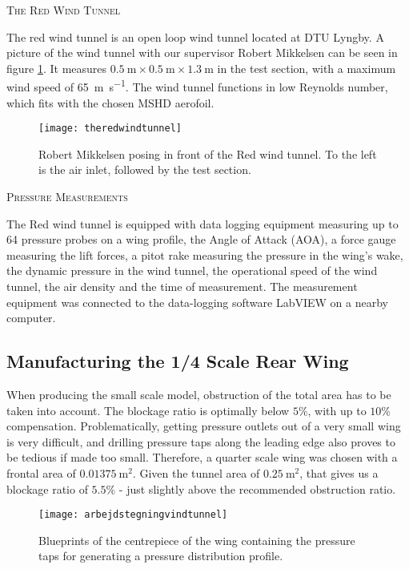     \textsc{The Red Wind Tunnel}

      The red wind tunnel is an open loop wind tunnel located at DTU Lyngby. A picture of the wind tunnel with our supervisor Robert Mikkelsen can be seen in figure \ref{fig:theredwindtunnel}. It measures $\SI{0.5}{\metre} \times \SI{0.5}{\metre} \times \SI{1.3}{\metre}$ in the test section, with a maximum wind speed of \SI{65}{\metre\per\second}. The wind tunnel functions in low Reynolds number, which fits with the chosen MSHD aerofoil.

      \begin{figure}
        \texttt{[image: theredwindtunnel]}
        \caption{Robert Mikkelsen posing in front of the Red wind tunnel. To the left is the air inlet, followed by the test section.}
        \label{fig:theredwindtunnel}
      \end{figure}

    \textsc{Pressure Measurements}

      The Red wind tunnel is equipped with data logging equipment measuring up to 64 pressure probes on a wing profile, the Angle of Attack (AOA), a force gauge measuring the lift forces, a pitot rake measuring the pressure in the wing's wake, the dynamic pressure in the wind tunnel, the operational speed of the wind tunnel, the air density and the time of measurement. The measurement equipment was connected to the data-logging software LabVIEW on a nearby computer.

  \subsection{Manufacturing the 1/4 Scale Rear Wing}

    When producing the small scale model, obstruction of the total area has to be taken into account. The blockage ratio is optimally below $5\%$, with up to $10\%$ compensation. Problematically, getting pressure outlets out of a very small wing is very difficult, and drilling pressure taps along the leading edge also proves to be tedious if made too small. Therefore, a quarter scale wing was chosen with a frontal area of $\SI{0.01375}{\metre\squared}$. Given the tunnel area of $\SI{0.25}{\metre\squared}$, that gives us a blockage ratio of $5.5\%$ - just slightly above the recommended obstruction ratio.

    \begin{figure}
      \texttt{[image: arbejdstegningvindtunnel]}
      \caption{Blueprints of the centrepiece of the wing containing the pressure taps for generating a pressure distribution profile.}
      \label{fig:scalewingblueprint}
    \end{figure}

